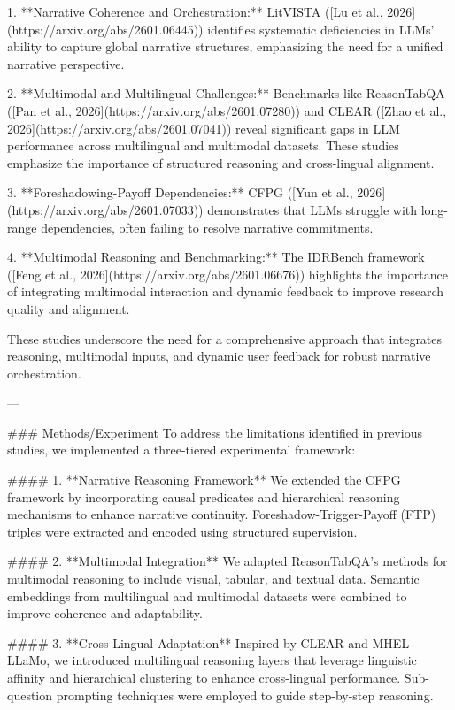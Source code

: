 1. **Narrative Coherence and Orchestration:** LitVISTA ([Lu et al., 2026](https://arxiv.org/abs/2601.06445)) identifies systematic deficiencies in LLMs' ability to capture global narrative structures, emphasizing the need for a unified narrative perspective.

2. **Multimodal and Multilingual Challenges:** Benchmarks like ReasonTabQA ([Pan et al., 2026](https://arxiv.org/abs/2601.07280)) and CLEAR ([Zhao et al., 2026](https://arxiv.org/abs/2601.07041)) reveal significant gaps in LLM performance across multilingual and multimodal datasets. These studies emphasize the importance of structured reasoning and cross-lingual alignment.

3. **Foreshadowing-Payoff Dependencies:** CFPG ([Yun et al., 2026](https://arxiv.org/abs/2601.07033)) demonstrates that LLMs struggle with long-range dependencies, often failing to resolve narrative commitments.

4. **Multimodal Reasoning and Benchmarking:** The IDRBench framework ([Feng et al., 2026](https://arxiv.org/abs/2601.06676)) highlights the importance of integrating multimodal interaction and dynamic feedback to improve research quality and alignment.

These studies underscore the need for a comprehensive approach that integrates reasoning, multimodal inputs, and dynamic user feedback for robust narrative orchestration.

---

### Methods/Experiment
To address the limitations identified in previous studies, we implemented a three-tiered experimental framework:

#### 1. **Narrative Reasoning Framework**
We extended the CFPG framework by incorporating causal predicates and hierarchical reasoning mechanisms to enhance narrative continuity. Foreshadow-Trigger-Payoff (FTP) triples were extracted and encoded using structured supervision.

#### 2. **Multimodal Integration**
We adapted ReasonTabQA’s methods for multimodal reasoning to include visual, tabular, and textual data. Semantic embeddings from multilingual and multimodal datasets were combined to improve coherence and adaptability.

#### 3. **Cross-Lingual Adaptation**
Inspired by CLEAR and MHEL-LLaMo, we introduced multilingual reasoning layers that leverage linguistic affinity and hierarchical clustering to enhance cross-lingual performance. Sub-question prompting techniques were employed to guide step-by-step reasoning.

